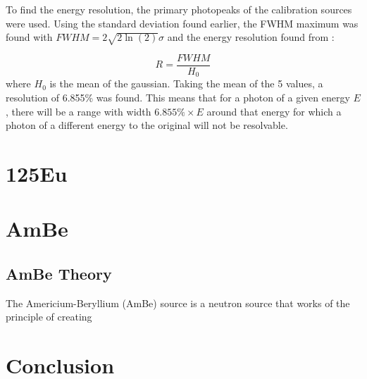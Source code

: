 \documentclass[11pt]{article}
\numberwithin{equation}{section}
\numberwithin{figure}{section}
\numberwithin{table}{section}
\begin{document}
To find the energy resolution, the primary photopeaks of the calibration sources were used. Using the standard deviation found earlier, the FWHM maximum was found with $FWHM=2\sqrt{2\ln(2)}\sigma$ and the energy resolution found from \cite[Fig. 4.5]{Knoll}:

\begin{equation}
    R=\frac{FWHM}{H_0}
    \label{eqn:EnergyResolution}
\end{equation}
where $H_0$ is the mean of the gaussian. Taking the mean of the 5 values, a resolution of 6.855\% was found. This means that for a photon of a given energy $E$, there will be a range with width $6.855\%\times E$ around that energy for which a photon of a different energy to the original will not be resolvable. 

\section{125Eu}\label{sec:Eu}


\section{AmBe}\label{sec:AmBe}

\subsection{AmBe Theory}
The Americium-Beryllium (AmBe) source is a neutron source that works of the principle of creating 

\section{Conclusion}\label{sec:Conclusion}

\newpage
\printbibliography
\end{document}
